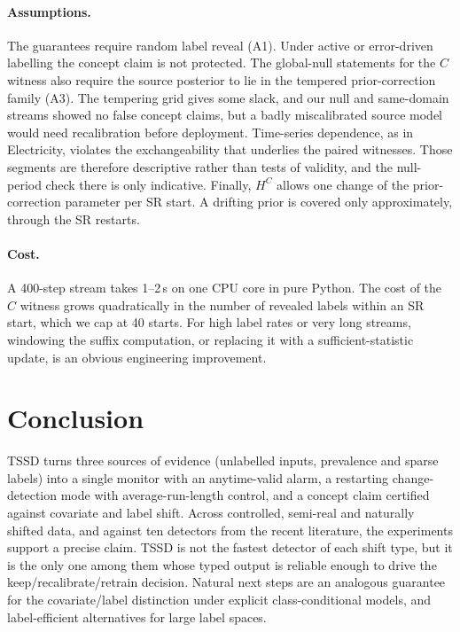 \paragraph{Assumptions.} The guarantees require random label reveal (A1). Under active or error-driven labelling the concept claim is not protected. The global-null statements for the $C$ witness also require the source posterior to lie in the tempered prior-correction family (A3). The tempering grid gives some slack, and our null and same-domain streams showed no false concept claims, but a badly miscalibrated source model would need recalibration before deployment. Time-series dependence, as in Electricity, violates the exchangeability that underlies the paired witnesses. Those segments are therefore descriptive rather than tests of validity, and the null-period check there is only indicative. Finally, $H^C$ allows one change of the prior-correction parameter per SR start. A drifting prior is covered only approximately, through the SR restarts.

\paragraph{Cost.} A 400-step stream takes 1--2\,s on one CPU core in pure Python. The cost of the $C$ witness grows quadratically in the number of revealed labels within an SR start, which we cap at 40 starts. For high label rates or very long streams, windowing the suffix computation, or replacing it with a sufficient-statistic update, is an obvious engineering improvement.

\section{Conclusion}
\label{sec:conclusion}

TSSD turns three sources of evidence (unlabelled inputs, prevalence and sparse labels) into a single monitor with an anytime-valid alarm, a restarting change-detection mode with average-run-length control, and a concept claim certified against covariate and label shift. Across controlled, semi-real and naturally shifted data, and against ten detectors from the recent literature, the experiments support a precise claim. TSSD is not the fastest detector of each shift type, but it is the only one among them whose typed output is reliable enough to drive the keep/recalibrate/retrain decision. Natural next steps are an analogous guarantee for the covariate/label distinction under explicit class-conditional models, and label-efficient alternatives for large label spaces.
